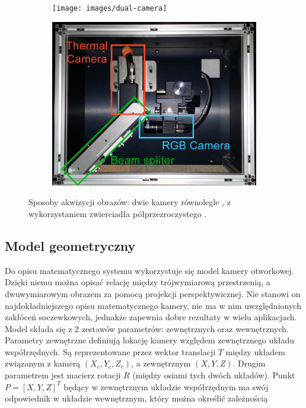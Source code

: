 \begin{figure}[h]
\centering
\begin{subfigure}{0.45\textwidth}
\centering
\texttt{[image: images/dual-camera]}
\subcaption{\label{dual_camera}}
\end{subfigure}
\begin{subfigure}{0.45\textwidth}
\centering
\includegraphics[width=1\textwidth]{images/multispectral}
\subcaption{\label{multispectral}}
\end{subfigure}
\caption{\label{fig:cameras_systems}Sposoby akwizycji obrazów: \protect{} dwie kamery równolegle \cite{lee2015robust}, \protect{} z wykorzystaniem zwierciadła półprzezroczystego \cite{hwang2015multispectral}.}
\end{figure}


\subsection{Model geometryczny}

Do opisu matematycznego systemu wykorzystuje się model kamery otworkowej. 
Dzięki niemu można opisać relację między trójwymiarową przestrzenią, a dwuwymiarowym obrazem za pomocą projekcji perspektywicznej. %
Nie stanowi on najdokładniejszego opisu matematycznego kamery, nie ma w nim uwzględnionych zakłóceń soczewkowych, jednakże zapewnia dobre rezultaty w wielu aplikacjach. %
Model składa się z 2 zestawów parametrów: zewnętrznych oraz wewnętrznych.
Parametry zewnętrzne definiują lokację kamery względem zewnętrznego układu współrzędnych. 
Są reprezentowane przez wektor translacji \(T\) między układem związanym z kamerą \( \left ( X_{c},Y_{c},Z_{c}\right ) \),
a zewnętrznym \(\left ( X,Y,Z\right )\). 
Drugim parametrem jest macierz rotacji \( R \) (między osiami tych dwóch układów).
Punkt \(P = \left [ X,Y,Z \right ]^T \) będący w zewnętrznym układzie współrzędnym ma swój odpowiednik w układzie wewnętrznym, który można określić zależnością 


